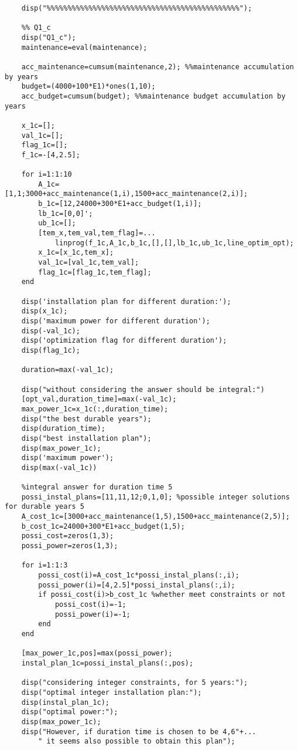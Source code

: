 \documentclass[titlepage,a4paper]{article}
\begin{document}
\begin{lstlisting}
    disp("%%%%%%%%%%%%%%%%%%%%%%%%%%%%%%%%%%%%%%%%%%%%%%");
    
    %% Q1_c
    disp("Q1_c");
    maintenance=eval(maintenance);
    
    acc_maintenance=cumsum(maintenance,2); %%maintenance accumulation by years
    budget=(4000+100*E1)*ones(1,10);
    acc_budget=cumsum(budget); %%maintenance budget accumulation by years
    
    x_1c=[];
    val_1c=[];
    flag_1c=[];
    f_1c=-[4,2.5];
    
    for i=1:1:10
        A_1c=[1,1;3000+acc_maintenance(1,i),1500+acc_maintenance(2,i)];
        b_1c=[12,24000+300*E1+acc_budget(1,i)];
        lb_1c=[0,0]';
        ub_1c=[];
        [tem_x,tem_val,tem_flag]=...
            linprog(f_1c,A_1c,b_1c,[],[],lb_1c,ub_1c,line_optim_opt);
        x_1c=[x_1c,tem_x];
        val_1c=[val_1c,tem_val];
        flag_1c=[flag_1c,tem_flag];
    end
    
    disp('installation plan for different duration:');
    disp(x_1c);
    disp('maximum power for different duration');
    disp(-val_1c);
    disp('optimization flag for different duration');
    disp(flag_1c);
    
    duration=max(-val_1c);
    
    disp("without considering the answer should be integral:")
    [opt_val,duration_time]=max(-val_1c);
    max_power_1c=x_1c(:,duration_time);
    disp("the best durable years");
    disp(duration_time);
    disp("best installation plan");
    disp(max_power_1c);
    disp('maximum power');
    disp(max(-val_1c))
    
    %integral answer for duration time 5
    possi_instal_plans=[11,11,12;0,1,0]; %possible integer solutions for durable years 5
    A_cost_1c=[3000+acc_maintenance(1,5),1500+acc_maintenance(2,5)];
    b_cost_1c=24000+300*E1+acc_budget(1,5);
    possi_cost=zeros(1,3);
    possi_power=zeros(1,3);
    
    for i=1:1:3
        possi_cost(i)=A_cost_1c*possi_instal_plans(:,i);
        possi_power(i)=[4,2.5]*possi_instal_plans(:,i);
        if possi_cost(i)>b_cost_1c %whether meet constraints or not
            possi_cost(i)=-1;
            possi_power(i)=-1;
        end
    end
    
    [max_power_1c,pos]=max(possi_power);
    instal_plan_1c=possi_instal_plans(:,pos);
    
    disp("considering integer constraints, for 5 years:");
    disp("optimal integer installation plan:");
    disp(instal_plan_1c);
    disp("optimal power:");
    disp(max_power_1c);
    disp("However, if duration time is chosen to be 4,6"+...
        " it seems also possible to obtain this plan");
    

\end{lstlisting}
\end{document}

